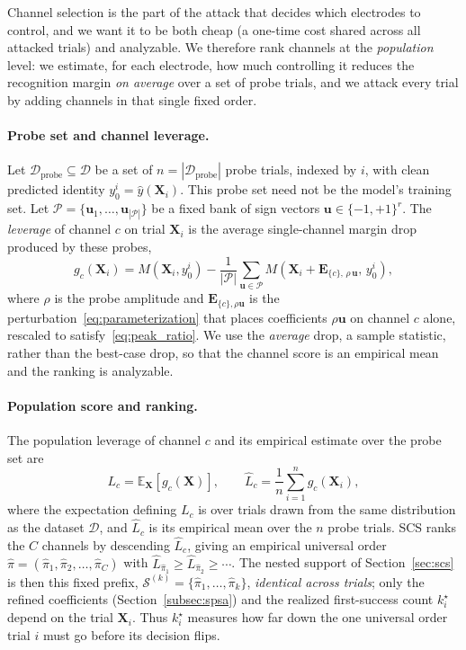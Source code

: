 \documentclass[journal]{IEEEtran}
\begin{document}
Channel selection is the part of the attack that decides which electrodes to control, and we want it to be both cheap (a one-time cost shared across all attacked trials) and analyzable. We therefore rank channels at the \emph{population} level: we estimate, for each electrode, how much controlling it reduces the recognition margin \emph{on average} over a set of probe trials, and we attack every trial by adding channels in that single fixed order.

\paragraph{Probe set and channel leverage.}
Let $\mathcal{D}_{\mathrm{probe}}\subseteq\mathcal{D}$ be a set of $n=|\mathcal{D}_{\mathrm{probe}}|$ probe trials, indexed by $i$, with clean predicted identity $y_0^i=\hat{y}(\mathbf{X}_i)$. This probe set need not be the model's training set. Let $\mathcal{P}=\{\mathbf{u}_1,\ldots,\mathbf{u}_{|\mathcal{P}|}\}$ be a fixed bank of sign vectors $\mathbf{u}\in\{-1,+1\}^{r}$. The \emph{leverage} of channel $c$ on trial $\mathbf{X}_i$ is the average single-channel margin drop produced by these probes,
\begin{equation}
g_c(\mathbf{X}_i)=M(\mathbf{X}_i,y_0^i)-\frac{1}{|\mathcal{P}|}\sum_{\mathbf{u}\in\mathcal{P}}M\!\left(\mathbf{X}_i+\mathbf{E}_{\{c\},\,\rho\,\mathbf{u}},\,y_0^i\right),
\label{eq:leverage}
\end{equation}
where $\rho$ is the probe amplitude and $\mathbf{E}_{\{c\},\rho\mathbf{u}}$ is the perturbation~\eqref{eq:parameterization} that places coefficients $\rho\mathbf{u}$ on channel $c$ alone, rescaled to satisfy~\eqref{eq:peak_ratio}. We use the \emph{average} drop, a sample statistic, rather than the best-case drop, so that the channel score is an empirical mean and the ranking is analyzable.

\paragraph{Population score and ranking.}
The population leverage of channel $c$ and its empirical estimate over the probe set are
\begin{equation}
L_c=\mathbb{E}_{\mathbf{X}}\!\left[g_c(\mathbf{X})\right],
\qquad
\widehat{L}_c=\frac{1}{n}\sum_{i=1}^{n} g_c(\mathbf{X}_i),
\label{eq:pop_leverage}
\end{equation}
where the expectation defining $L_c$ is over trials drawn from the same distribution as the dataset $\mathcal{D}$, and $\widehat{L}_c$ is its empirical mean over the $n$ probe trials. SCS ranks the $C$ channels by descending $\widehat{L}_c$, giving an empirical universal order $\widehat{\pi}=(\widehat{\pi}_1,\widehat{\pi}_2,\ldots,\widehat{\pi}_C)$ with $\widehat{L}_{\widehat{\pi}_1}\ge\widehat{L}_{\widehat{\pi}_2}\ge\cdots$. The nested support of Section~\ref{sec:scs} is then this fixed prefix, $\mathcal{S}^{(k)}=\{\widehat{\pi}_1,\ldots,\widehat{\pi}_k\}$, \emph{identical across trials}; only the refined coefficients (Section~\ref{subsec:spsa}) and the realized first-success count $k_i^\star$ depend on the trial $\mathbf{X}_i$. Thus $k_i^\star$ measures how far down the one universal order trial $i$ must go before its decision flips.
\end{document}
